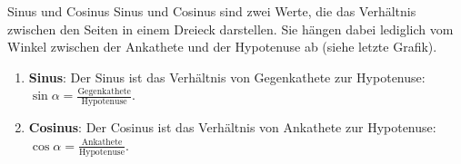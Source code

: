 \begin{bla}{Sinus und Cosinus}
  Sinus und Cosinus sind zwei Werte, die das Verhältnis zwischen den Seiten in einem Dreieck darstellen. Sie hängen dabei lediglich vom Winkel zwischen der Ankathete und der Hypotenuse ab (siehe letzte Grafik).
  \begin{enumerate}
    \item \textbf{Sinus}: Der Sinus ist das Verhältnis von Gegenkathete zur Hypotenuse: $\sin \alpha = \frac{\text{Gegenkathete}}{\text{Hypotenuse}}$.
    \item \textbf{Cosinus}: Der Cosinus ist das Verhältnis von Ankathete zur Hypotenuse: $\cos \alpha = \frac{\text{Ankathete}}{\text{Hypotenuse}}$.
  \end{enumerate}
\end{bla}

